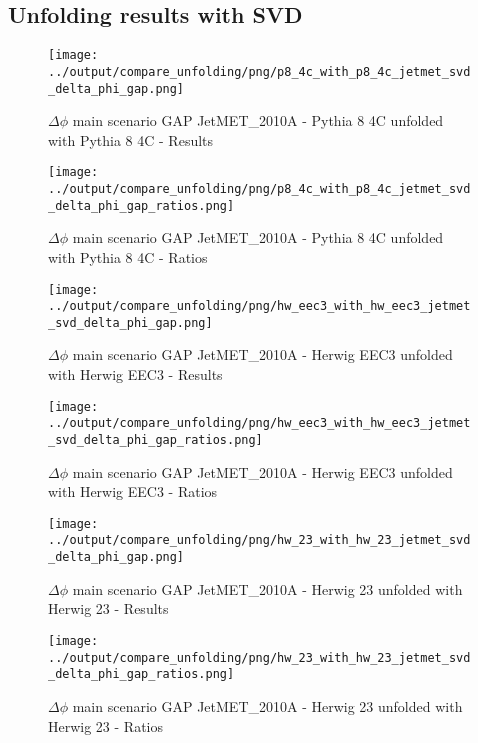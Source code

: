 \documentclass[11pt]{book}
\begin{document}
\clearpage
\subsection{Unfolding results with SVD}

\begin{figure}[ht]
\centering
\texttt{[image: ../output/compare\_unfolding/png/p8\_4c\_with\_p8\_4c\_jetmet\_svd\_delta\_phi\_gap.png]}
\caption{$\Delta\phi$ main scenario GAP JetMET\_2010A - Pythia 8 4C unfolded with Pythia 8 4C - Results}
\label{p8_p8_jetmet_svd_delta_phi_gap_a}
\end{figure}

\begin{figure}[ht]
\centering
\texttt{[image: ../output/compare\_unfolding/png/p8\_4c\_with\_p8\_4c\_jetmet\_svd\_delta\_phi\_gap\_ratios.png]}
\caption{$\Delta\phi$ main scenario GAP JetMET\_2010A - Pythia 8 4C unfolded with Pythia 8 4C - Ratios}
\label{p8_p8_jetmet_svd_delta_phi_gap_b}
\end{figure}

\begin{figure}[ht]
\centering
\texttt{[image: ../output/compare\_unfolding/png/hw\_eec3\_with\_hw\_eec3\_jetmet\_svd\_delta\_phi\_gap.png]}
\caption{$\Delta\phi$ main scenario GAP JetMET\_2010A - Herwig EEC3 unfolded with Herwig EEC3 - Results}
\label{hw_eec3_hw_eec3_jetmet_svd_delta_phi_gap_a}
\end{figure}

\begin{figure}[ht]
\centering
\texttt{[image: ../output/compare\_unfolding/png/hw\_eec3\_with\_hw\_eec3\_jetmet\_svd\_delta\_phi\_gap\_ratios.png]}
\caption{$\Delta\phi$ main scenario GAP JetMET\_2010A - Herwig EEC3 unfolded with Herwig EEC3 - Ratios}
\label{hw_eec3_hw_eec3_jetmet_svd_delta_phi_gap_b}
\end{figure}

\begin{figure}[ht]
\centering
\texttt{[image: ../output/compare\_unfolding/png/hw\_23\_with\_hw\_23\_jetmet\_svd\_delta\_phi\_gap.png]}
\caption{$\Delta\phi$ main scenario GAP JetMET\_2010A - Herwig 23 unfolded with Herwig 23 - Results}
\label{hw_23_hw_23_jetmet_svd_delta_phi_gap_a}
\end{figure}

\begin{figure}[ht]
\centering
\texttt{[image: ../output/compare\_unfolding/png/hw\_23\_with\_hw\_23\_jetmet\_svd\_delta\_phi\_gap\_ratios.png]}
\caption{$\Delta\phi$ main scenario GAP JetMET\_2010A - Herwig 23 unfolded with Herwig 23 - Ratios}
\label{hw_23_hw_23_jetmet_svd_delta_phi_gap_b}
\end{figure}
\end{document}
